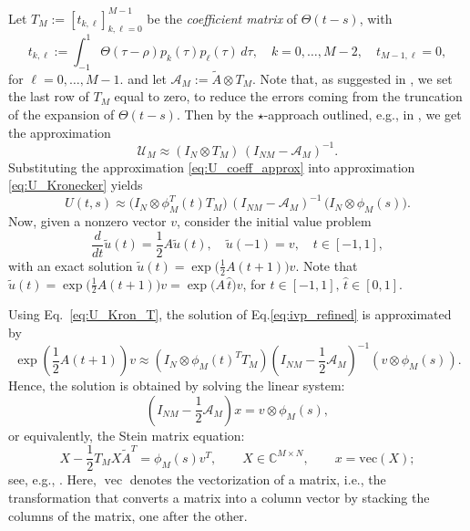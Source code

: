 \documentclass[final,1p,times,number]{elsarticle}
\theoremstyle{plain}%
\begin{document}
Let \(T_M:=[t_{k,\ell}]_{k,\ell=0}^{M-1}\) be the \emph{coefficient matrix} of $\Theta(t-s)$, with
\begin{equation} \label{eq:coeff_heavidise}
t_{k,\ell} := \int_{-1}^1 \Theta(\tau-\rho) p_k(\tau)p_\ell(\tau)\,d\tau, \quad k=0,\dots, M-2, \quad t_{M-1,\ell} = 0,
\end{equation}
for $\ell = 0, \dots, M-1$.
and let \(\mathcal A_M := \tilde{A} \otimes T_M\). 
Note that, as suggested in \cite{pozza2023newk}, we set the last row of $T_M$ equal to zero, to reduce the errors coming from the truncation of the expansion of $\Theta(t-s)$. 
Then by the $\star$-approach outlined, e.g., in \cite{Pozzxa, pozza2023newk}, we get the approximation
\begin{equation}\label{eq:U_coeff_approx}
\mathcal U_M
   \approx
   (I_N \otimes T_M)\,
   (I_{NM} - \mathcal A_M)^{-1}.
\end{equation}
Substituting the approximation \eqref{eq:U_coeff_approx} into approximation \eqref{eq:U_Kronecker} yields
\begin{equation}\label{eq:U_Kron_T}
U(t,s)
   \approx
   \big(I_N \otimes \phi_M^T(t) T_M\big)\,
   (I_{NM} - \mathcal A_M)^{-1}\,
   \big(I_N \otimes \phi_M(s)\big).
\end{equation}
Now, given a nonzero vector $v$, consider the initial value problem 
\begin{equation}\label{eq:ivp_refined}
\frac{d}{dt} \tilde{u}(t) = \frac{1}{2} A \tilde{u}(t), \quad \tilde{u}(-1) = v, \quad t \in [-1,1],
\end{equation}
with an exact solution $\tilde{u}(t) = \exp\!\big(\frac{1}{2} A (t+1)\big) v$. Note that $\tilde{u}(t) = \exp\!\big(\frac{1}{2} A (t+1)\big) v  = \exp\!\big( A \, \hat{t}\big) v$, for $t \in [-1,1], \, \hat{t} \in [0,1]$.

Using Eq.~\eqref{eq:U_Kron_T}, the solution of Eq.\eqref{eq:ivp_refined} is approximated by
\begin{equation*}\label{eq:expAv_refined}
\exp\left(\frac{1}{2}A(t+1)\right)v \approx \left(I_N \otimes \phi_M(t)^T T_M \right) 
\left(I_{NM} - \frac{1}{2} \mathcal{A}_M\right)^{-1} 
\left(v \otimes \phi_M(s)\right).
\end{equation*}
Hence, the solution is obtained by solving the linear system:
\begin{equation}\label{eq:linsyst}
\left(I_{NM} - \frac{1}{2} \mathcal{A}_M\right)x = v \otimes \phi_M(s),
\end{equation}
or equivalently, the Stein matrix equation:
\begin{equation}\label{eq:Stein_refined}
X - \frac{1}{2} T_M X \tilde{A}^{T}
   = \phi_M(s) v^{T}, 
   \qquad X \in \mathbb{C}^{M \times N}, 
   \qquad x = \mathrm{vec}(X);
\end{equation}
see, e.g., \cite{simoncini2016computational}.
Here, $\operatorname{vec}$ denotes the vectorization of a matrix, i.e., the transformation that converts a matrix into a column vector by stacking the columns of the matrix, one after the other. 
\end{document}
